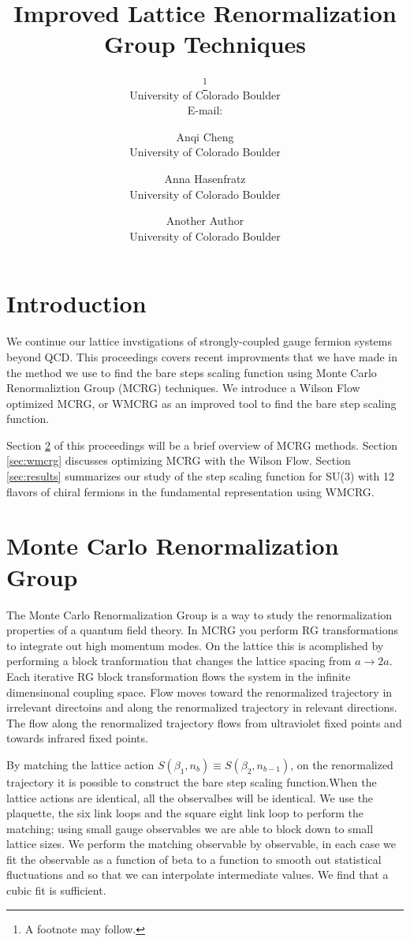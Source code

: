 \documentclass{PoS}
\title{Improved Lattice Renormalization Group Techniques}
\author{\speaker{Gregory Petropoulos}\thanks{A footnote may follow.}\\
        University of Colorado Boulder\\
        E-mail: \email{gregory.petropoulos@colorado.edu}}
\author{Anqi Cheng\\
        University of Colorado Boulder}
\author{Anna Hasenfratz\\
        University of Colorado Boulder}
\author{Another Author\\
        University of Colorado Boulder}
\begin{document}
\section{Introduction}
We continue our lattice invstigations of strongly-coupled gauge fermion systems beyond QCD.
This proceedings covers recent improvments that we have made in the method we use to find the bare steps scaling function using Monte Carlo Renormaliztion Group (MCRG) techniques.
We introduce a Wilson Flow optimized MCRG, or WMCRG as an improved tool to find the bare step scaling function.

Section \ref{sec:mcrg} of this proceedings will be a brief overview of MCRG methods.  
Section \ref{sec:wmcrg} discusses optimizing MCRG with the Wilson Flow.  
Section \ref{sec:results} summarizes our study of the step scaling function for SU(3) with 12 flavors of chiral fermions in the fundamental representation using WMCRG.

\section{Monte Carlo Renormalization Group}
\label{sec:mcrg}
The Monte Carlo Renormalization Group is a way to study the renormalization properties of a quantum field theory.
In MCRG you perform RG transformations to integrate out high momentum modes.
On the lattice this is acomplished by performing a block tranformation that changes the lattice spacing from $a \rightarrow 2a$.
Each iterative RG block transformation flows the system in the infinite dimensinonal coupling space.
Flow moves toward the renormalized trajectory in irrelevant directoins and along the renormalized trajectory in relevant directions.
The flow along the renormalized trajectory flows from ultraviolet fixed points and towards infrared fixed points.

By matching the lattice action $S(\beta_1,n_b) \equiv S(\beta_2,n_{b-1})$, on the renormalized trajectory it is possible to construct the bare step scaling function.When the lattice actions are identical, all the observalbes will be identical.
We use the plaquette, the six link loops and the square eight link loop to perform the matching; using small gauge observables we are able to block down to small lattice sizes.
We perform the matching observable by observable, in each case we fit the observable as a function of beta to a function to smooth out statistical fluctuations and so that we can interpolate intermediate values.
We find that a cubic fit is sufficient.
\end{document}
